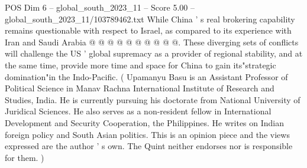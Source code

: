 \begin{textsample}{POS Dim 6 – global\_south\_2023\_11 – Score 5.00 – global\_south\_2023\_11/103789462.txt}
While China ' s real brokering capability remains questionable with respect to Israel, as compared to its experience with Iran and Saudi Arabia @ @ @ @ @ @ @ @ @ @.
These diverging sets of conflicts will challenge the US ' global supremacy as a provider of regional stability, and at the same time, provide more time and space for China to gain its"strategic domination"in the Indo-Pacific. ( Upamanyu Basu is an Assistant Professor of Political Science in Manav Rachna International Institute of Research and Studies, India.
He is currently pursuing his doctorate from National University of Juridical Sciences.
He also serves as a non-resident fellow in International Development and Security Cooperation, the Philippines.
He writes on Indian foreign policy and South Asian politics.
This is an opinion piece and the views expressed are the author ' s own.
The Quint neither endorses nor is responsible for them. )

\end{textsample}
